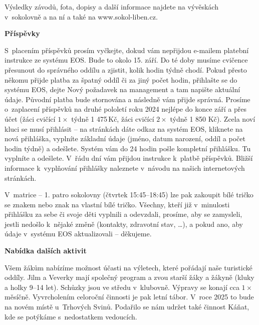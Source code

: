 \documentclass[11pt]{article}
\begin{document}
Výsledky závodů, fota, dopisy a další informace najdete na vývěskách v~sokolovně a na ní a také na www.sokol-liben.cz.


\vspace*{12pt}
\begin{center}
  \noindent\textbf{Příspěvky}
\end{center}
\vspace*{6pt}
S~placením příspěvků prosím vyčkejte, dokud vám nepřijdou e-mailem platební instrukce ze systému EOS. Bude to okolo 15. září. Do té doby musíme cvičence přesunout do správného oddílu a zjistit, kolik hodin týdně chodí. Pokud přesto někomu přijde platba za špatný oddíl či za jiný počet hodin, přihlašte se do systému EOS, dejte \luv{}Nový požadavek na management\ruv{} a tam napište aktuální údaje. Původní platba bude stornována a následně vám přijde správná. Prosíme o~zaplacení příspěvků na druhé pololetí roku 2024 nejlépe do konce září a přes účet (žáci cvičící $1\times$ týdně 1 475\,Kč, žáci cvičící $2\times$ týdně 1 850 Kč). Zcela noví kluci se musí přihlásit – na stránkách dáte odkaz na systém EOS, kliknete na nová přihláška, vyplníte základní údaje (jméno, datum narození, oddíl a počet hodin týdně) a odešlete. Systém vám do 24 hodin pošle kompletní přihlášku. Tu vyplníte a odešlete. V~řádu dní vám přijdou instrukce k~platbě příspěvků. Bližší informace k~vyplňování přihlášky naleznete v~návodu na našich internetových stránkách. 

V~matrice – 1. patro sokolovny (čtvrtek 15:45–18:45) lze pak zakoupit bílé tričko se znakem nebo znak na vlastní bílé tričko. Všechny, kteří již v~minulosti přihlášku za sebe či svoje děti vyplnili a odevzdali, prosíme, aby se zamysleli, jestli nedošlo k~nějaké změně (kontakty, zdravotní stav, \ldots), a pokud ano, aby údaje v~systému EOS aktualizovali – děkujeme.

\vspace*{12pt}
\begin{center}
  \noindent\textbf{Nabídka dalších aktivit}
\end{center}
\vspace*{6pt}
Všem žákům nabízíme možnost účasti na výletech, které pořádají naše turistické oddíly. Jilm a Veverky mají společný program a zvou starší žáky a žákyně (kluky a holky 9–14 let). Schůzky jsou ve středu v~klubovně. Výpravy se konají cca $1\times$ měsíčně. Vyvrcholením celoroční činnosti je pak letní tábor. V~roce 2025 to bude na novém místě u~Trhových Svinů. Podařilo se nám udržet také činnost Káňat, kde se potýkáme s~nedostatkem vedoucích.
\end{document}
